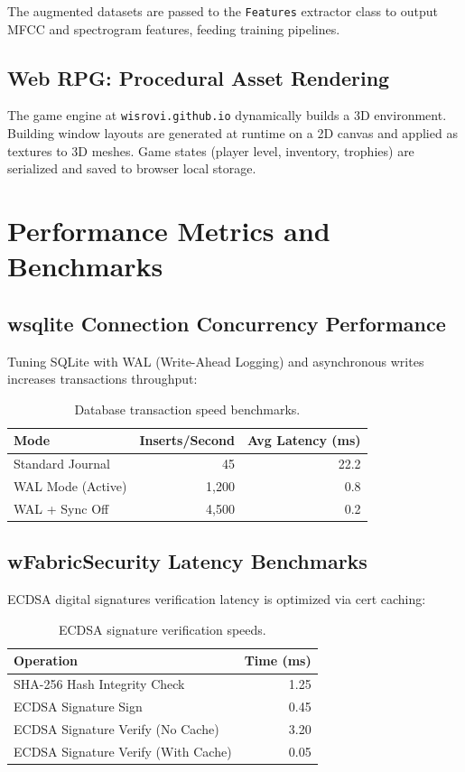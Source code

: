 \documentclass[12pt,a4paper]{report}
\begin{document}
The augmented datasets are passed to the \texttt{Features} extractor class to output MFCC and spectrogram features, feeding training pipelines.

\section{\sffamily Web RPG: Procedural Asset Rendering}
The game engine at \texttt{wisrovi.github.io} dynamically builds a 3D environment. Building window layouts are generated at runtime on a 2D canvas and applied as textures to 3D meshes. Game states (player level, inventory, trophies) are serialized and saved to browser local storage.

\cleardoublepage
\chapter{Performance Metrics and Benchmarks}

\section{\sffamily wsqlite Connection Concurrency Performance}
Tuning SQLite with WAL (Write-Ahead Logging) and asynchronous writes increases transactions throughput:

\begin{table}[H]
    \centering
    \caption{Database transaction speed benchmarks.}
    \label{tab:db_benchmarks}
    \begin{tabular}{lrr}
        \toprule
        \textbf{Mode} & \textbf{Inserts/Second} & \textbf{Avg Latency (ms)} \\
        \midrule
        Standard Journal & 45 & 22.2 \\
        WAL Mode (Active) & 1,200 & 0.8 \\
        WAL + Sync Off & 4,500 & 0.2 \\
        \bottomrule
    \end{tabular}
\end{table}

\section{\sffamily wFabricSecurity Latency Benchmarks}
ECDSA digital signatures verification latency is optimized via cert caching:

\begin{table}[H]
    \centering
    \caption{ECDSA signature verification speeds.}
    \label{tab:security_benchmarks}
    \begin{tabular}{lr}
        \toprule
        \textbf{Operation} & \textbf{Time (ms)} \\
        \midrule
        SHA-256 Hash Integrity Check & 1.25 \\
        ECDSA Signature Sign & 0.45 \\
        ECDSA Signature Verify (No Cache) & 3.20 \\
        ECDSA Signature Verify (With Cache) & 0.05 \\
        \bottomrule
    \end{tabular}
\end{table}
\end{document}
